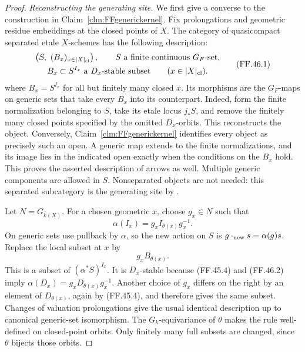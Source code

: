 \begin{proof}
\emph{Reconstructing the generating site.}
We first give a converse to the construction in
Claim~\ref{clm:FFgenerickernel}. Fix prolongations and
geometric residue embeddings at the closed points of
\(X\). The category of quasicompact separated etale
\(X\)-schemes has the following description:
\[
 \begin{gathered}
 \left(S,\ (B_x)_{x\in|X|_{\rm cl}}\right),
 \qquad S\text{ a finite continuous }G_F\text{-set},\\
 B_x\subset S^{I_x}\text{ a }D_x\text{-stable subset}
       \qquad(x\in|X|_{\rm cl}).
 \end{gathered}
                                                        \tag{FF.46.1}
\]
where \(B_x=S^{I_x}\) for all but finitely many closed
\(x\). Its morphisms are the \(G_F\)-maps on generic
sets that take every \(B_x\) into its counterpart.
Indeed, form the finite normalization belonging to
\(S\), take its etale locus \(j_*S\), and remove
the finitely many closed points specified by the omitted
\(D_x\)-orbits. This reconstructs the object. Conversely,
Claim~\ref{clm:FFgenerickernel} identifies every object
as precisely such an open. A generic map extends to the
finite normalizations, and its image lies in the indicated
open exactly when the conditions on the \(B_x\) hold.
This proves the asserted description of arrows as well.
Multiple generic components are allowed in \(S\).
Nonseparated objects are not needed: this separated
subcategory is the generating site by
\citet[Theorem~A.8 and Corollary~A.11]{FF_CHW2024}.

Let \(N=G_{\bar k(X)}\). For a chosen geometric
\(x\), choose \(g_x\in N\) such that
\[
                  \alpha(I_x)=g_x I_{\theta(x)}g_x^{-1}.
                                                        \tag{FF.46.2}
\]
On generic sets use pullback by \(\alpha\), so the new
action on \(S\) is \(g\cdot_{\rm new}s=\alpha(g)s\).
Replace the local subset at \(x\) by
\[
                                g_x B_{\theta(x)}.
                                                        \tag{FF.46.3}
\]
This is a subset of \((\alpha^*S)^{I_x}\). It is
\(D_x\)-stable because (FF.45.4) and (FF.46.2) imply
\(\alpha(D_x)=g_xD_{\theta(x)}g_x^{-1}\).
Another choice of \(g_x\) differs on the right by an
element of \(D_{\theta(x)}\), again by (FF.45.4), and
therefore gives the same subset. Changes of valuation
prolongations give the usual identical description up
to canonical generic-set isomorphism. The
\(G_k\)-equivariance of \(\theta\) makes the rule
well-defined on closed-point orbits. Only finitely many
full subsets are changed, since \(\theta\) bijects
those orbits.


\end{proof}
